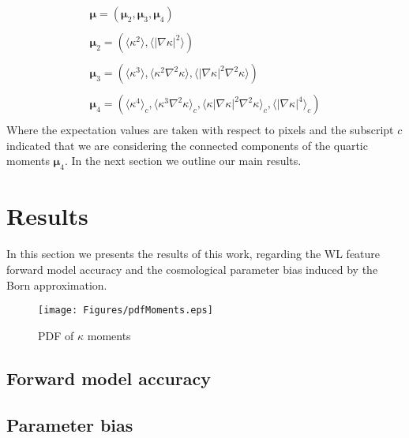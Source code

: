 \documentclass[reprint,aps,prd,superscriptaddress,showkeys,showpacs]{revtex4-1}
\begin{document}
\begin{equation}
\label{par:moments}
\begin{matrix}
\pmb{\mu} = (\pmb{\mu}_2,\pmb{\mu}_3,\pmb{\mu}_4) \\ \\
\pmb{\mu}_2 = \left(\langle\kappa^2\rangle,\langle\vert\nabla\kappa\vert^2\rangle\right) \\ \\
\pmb{\mu}_3 = \left(\langle\kappa^3\rangle,\langle\kappa^2\nabla^2\kappa\rangle,\langle\vert\nabla\kappa\vert^2\nabla^2\kappa\rangle\right) \\ \\
\pmb{\mu}_4 = \left(\langle\kappa^4\rangle_c,\langle\kappa^3\nabla^2\kappa\rangle_c,\langle\kappa\vert\nabla\kappa\vert^2\nabla^2\kappa\rangle_c,\langle\vert\nabla\kappa\vert^4\rangle_c\right) \\
\end{matrix}
\end{equation} 
%
Where the expectation values are taken with respect to pixels and the subscript $c$ indicated that we are considering the connected components of the quartic moments $\pmb{\mu}_4$. In the next section we outline our main results.  


\section{Results}
% 
In this section we presents the results of this work, regarding the WL feature forward model accuracy and the cosmological parameter bias induced by the Born approximation. 

\begin{figure*}
\begin{center}
\texttt{[image: Figures/pdfMoments.eps]}
\end{center}
\caption{PDF of $\kappa$ moments}
\label{fig:pdfMoments}
\end{figure*} 

\subsection{Forward model accuracy}



\subsection{Parameter bias}
\end{document}
